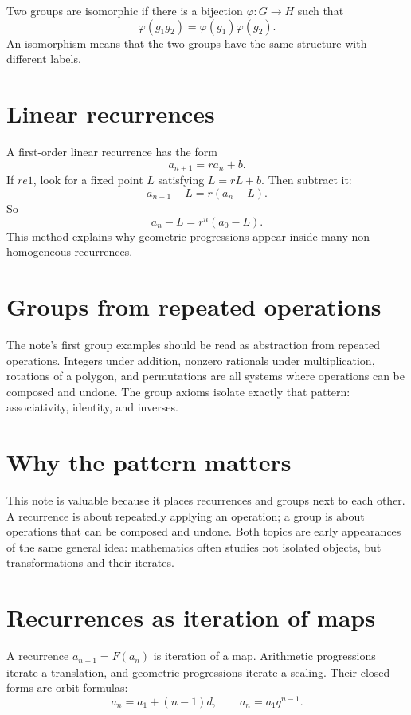 Two groups are isomorphic if there is a bijection \(\varphi:G\to H\) such that
\[
  \varphi(g_1g_2)=\varphi(g_1)\varphi(g_2).
\]
An isomorphism means that the two groups have the same structure with different labels.


\section{Linear recurrences}

A first-order linear recurrence has the form
\[
  a_{n+1}=ra_n+b.
\]
If \(r
e1\), look for a fixed point \(L\) satisfying \(L=rL+b\).  Then subtract it:
\[
  a_{n+1}-L=r(a_n-L).
\]
So
\[
  a_n-L=r^n(a_0-L).
\]
This method explains why geometric progressions appear inside many non-homogeneous recurrences.

\section{Groups from repeated operations}

The note's first group examples should be read as abstraction from repeated operations.  Integers under addition, nonzero rationals under multiplication, rotations of a polygon, and permutations are all systems where operations can be composed and undone.  The group axioms isolate exactly that pattern: associativity, identity, and inverses.

\section{Why the pattern matters}

This note is valuable because it places recurrences and groups next to each other.  A recurrence is about repeatedly applying an operation; a group is about operations that can be composed and undone.  Both topics are early appearances of the same general idea: mathematics often studies not isolated objects, but transformations and their iterates.

\section{Recurrences as iteration of maps}

A recurrence \(a_{n+1}=F(a_n)\) is iteration of a map.  Arithmetic progressions iterate a translation, and geometric progressions iterate a scaling.  Their closed forms are orbit formulas:
\[
  a_n=a_1+(n-1)d,\qquad a_n=a_1q^{n-1}.
\]

